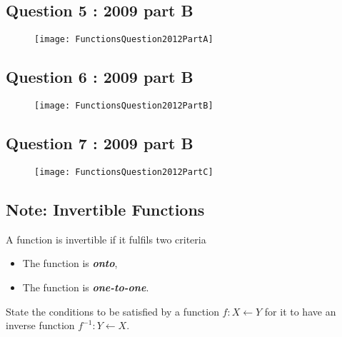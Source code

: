 \documentclass{article}
\begin{document}
\newpage
\subsection*{Question 5 : 2009 part B}

\begin{figure}[h!]
	\centering
	\texttt{[image: FunctionsQuestion2012PartA]}
	
\end{figure}


\newpage
\subsection*{Question 6 : 2009 part B}
\begin{figure}[h!]
	\centering
	\texttt{[image: FunctionsQuestion2012PartB]}
	
\end{figure}


\newpage
\subsection*{Question 7 : 2009 part B}
\begin{figure}[h!]
	\centering
	\texttt{[image: FunctionsQuestion2012PartC]}
	
\end{figure}

\newpage


\newpage

\subsection*{Note: Invertible Functions}
A function is invertible if it fulfils two criteria
\begin{itemize}
	\item The function is \textbf{\textit{onto}},
	\item The function is \textbf{\textit{one-to-one}}.
\end{itemize}
\begin{framed}
State the conditions to be satisfied by a function
$f : X \leftarrow Y$ for it to have an inverse function
$f^{-1} : Y \leftarrow X$.
\end{framed}
\end{document}
